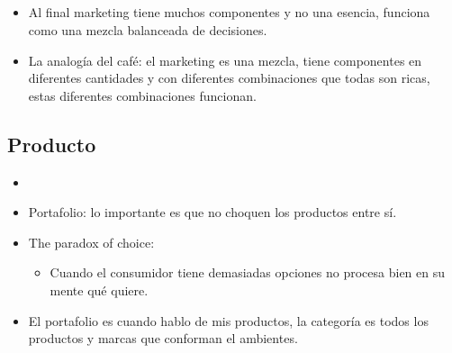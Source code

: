 \subsection{}
\begin{itemize}
    \item Al final marketing tiene muchos componentes y no una esencia, funciona como una mezcla balanceada de decisiones.
    \item La analogía del café: el marketing es una mezcla, tiene componentes en diferentes cantidades y con diferentes combinaciones que todas son ricas, estas diferentes combinaciones funcionan.
\end{itemize}


\subsection{Producto}
\begin{itemize}
    \item {}
    \item Portafolio: lo importante es que no choquen los productos entre sí. 
    \item The paradox of choice:
        \begin{itemize}
            \item Cuando el consumidor tiene demasiadas opciones no procesa bien en su mente qué quiere.
        \end{itemize}
    
    \item El portafolio es cuando hablo de mis productos, la categoría es todos los productos y marcas que conforman el ambientes.
\end{itemize}

